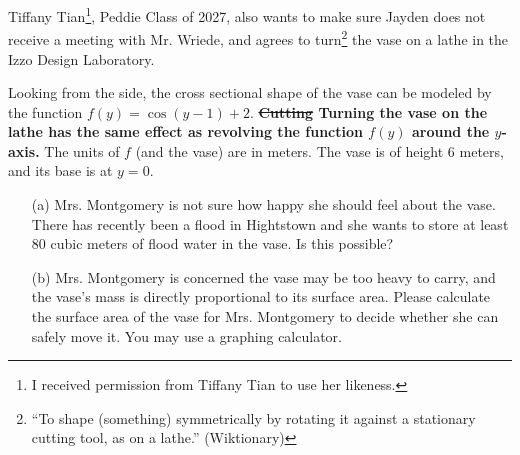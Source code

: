 \documentclass{article}
\begin{document}
Tiffany Tian\footnote{I received permission from Tiffany Tian to use her likeness.}, Peddie Class of 2027, also wants to make sure Jayden does not receive a meeting with Mr. Wriede, and agrees to turn\footnote{``To shape (something) symmetrically by rotating it against a stationary cutting tool, as on a lathe.'' (Wiktionary)} the vase on a lathe in the Izzo Design Laboratory.

Looking from the side, the cross sectional shape of the vase can be modeled by the function $f(y)=\cos(y-1)+2$. \textbf{\st{Cutting} Turning the vase on the lathe has the same effect as revolving the function $f(y)$ around the $y$-axis.} The units of $f$ (and the vase) are in meters. The vase is of height $6$ meters, and its base is at $y=0$. 


\begin{itemize}
	\item[(a)] Mrs. Montgomery is not sure how happy she should feel about the vase. There has recently been a flood in Hightstown and she wants to store at least $80$ cubic meters of flood water in the vase. Is this possible?


	\item[(b)] Mrs. Montgomery is concerned the vase may be too heavy to carry, and the vase's mass is directly proportional to its surface area. Please calculate the surface area of the vase for Mrs. Montgomery to decide whether she can safely move it. You may use a graphing calculator.
\end{itemize}

\newpage
\end{document}
